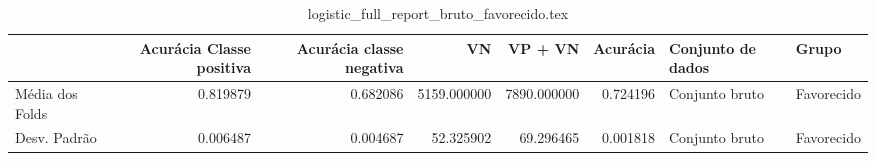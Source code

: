 \begin{table}
\centering
\caption{logistic_full_report_bruto_favorecido.tex}
\label{logistic_full_report_bruto_favorecido.tex}
\begin{tabular}{lrrrrrll}
\toprule
{}              &  Acurácia Classe positiva &  Acurácia classe negativa &          VN  &     VP + VN  &  Acurácia & Conjunto de dados &       Grupo \\
\midrule
Média dos Folds &                  0.819879 &                  0.682086 &  5159.000000 &  7890.000000 &  0.724196 &    Conjunto bruto &  Favorecido \\
Desv. Padrão    &                  0.006487 &                  0.004687 &    52.325902 &    69.296465 &  0.001818 &    Conjunto bruto &  Favorecido \\
\bottomrule
\end{tabular}
\end{table}
